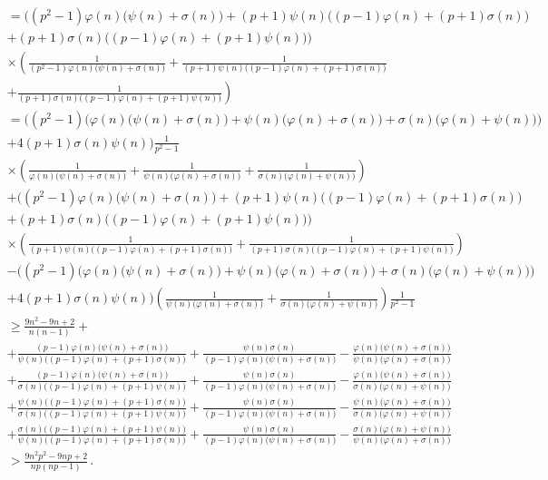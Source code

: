 \documentclass[12pt]{article}
\begin{document}
\begin{align*}
&=\Big((p^2-1)\varphi(n)\big(\psi(n)+\sigma(n)\big)+(p+1)\psi(n)\big((p-1)\varphi(n)+(p+1)\sigma(n)\big)\\
&+(p+1)\sigma(n)\big((p-1)\varphi(n)+(p+1)\psi(n)\big)\Big)\\
&\times\left(\frac{1}{(p^2-1)\varphi(n)\big(\psi(n)+\sigma(n)\big)}+\frac{1}{(p+1)\psi(n)\big((p-1)\varphi(n)+(p+1)\sigma(n)\big)}\right.\\
&\left.+\frac{1}{(p+1)\sigma(n)\big((p-1)\varphi(n)+(p+1)\psi(n)\big)}\right)\\
&=\bigg((p^2-1)\Big(\varphi(n)\big(\psi(n)+\sigma(n)\big)+\psi(n)\big(\varphi(n)+\sigma(n)\big)+\sigma(n)\big(\varphi(n)+\psi(n)\big)\Big)\\
&+4(p+1)\sigma(n)\psi(n)\bigg)\frac{1}{p^2-1}\\
&\times\left(\frac{1}{\varphi(n)\big(\psi(n)+\sigma(n)\big)}+\frac{1}{\psi(n)\big(\varphi(n)+\sigma(n)\big)}+\frac{1}{\sigma(n)\big(\varphi(n)+\psi(n)\big)}\right)\\
&+\Big((p^2-1)\varphi(n)\big(\psi(n)+\sigma(n)\big)+(p+1)\psi(n)\big((p-1)\varphi(n)+(p+1)\sigma(n)\big)\\
&+(p+1)\sigma(n)\big((p-1)\varphi(n)+(p+1)\psi(n)\big)\Big)\\
&\times\left(\frac{1}{(p+1)\psi(n)\big((p-1)\varphi(n)+(p+1)\sigma(n)\big)}+\frac{1}{(p+1)\sigma(n)\big((p-1)\varphi(n)+(p+1)\psi(n)\big)}\right)\\
&-\bigg((p^2-1)\Big(\varphi(n)\big(\psi(n)+\sigma(n)\big)+\psi(n)\big(\varphi(n)+\sigma(n)\big)+\sigma(n)\big(\varphi(n)+\psi(n)\big)\Big)\\
&+4(p+1)\sigma(n)\psi(n)\bigg)\left(\frac{1}{\psi(n)\big(\varphi(n)+\sigma(n)\big)}+\frac{1}{\sigma(n)\big(\varphi(n)+\psi(n)\big)}\right)\frac{1}{p^2-1}\\
&\geq\frac{9n^2-9n+2}{n(n-1)}+\\
&+\frac{(p-1)\varphi(n)\big(\psi(n)+\sigma(n)\big)}{\psi(n)\big((p-1)\varphi(n)+(p+1)\sigma(n)\big)}+\frac{\psi(n)\sigma(n)}{(p-1)\varphi(n)\big(\psi(n)+\sigma(n)\big)}
-\frac{\varphi(n)\big(\psi(n)+\sigma(n)\big)}{\psi(n)\big(\varphi(n)+\sigma(n)\big)}\nonumber\\
&+\frac{(p-1)\varphi(n)\big(\psi(n)+\sigma(n)\big)}{\sigma(n)\big((p-1)\varphi(n)+(p+1)\psi(n)\big)}+\frac{\psi(n)\sigma(n)}{(p-1)\varphi(n)\big(\psi(n)+\sigma(n)\big)}
-\frac{\varphi(n)\big(\psi(n)+\sigma(n)\big)}{\sigma(n)\big(\varphi(n)+\psi(n)\big)}\nonumber\\
&+\frac{\psi(n)\big((p-1)\varphi(n)+(p+1)\sigma(n)\big)}{\sigma(n)\big((p-1)\varphi(n)+(p+1)\psi(n)\big)}+\frac{\psi(n)\sigma(n)}{(p-1)\varphi(n)\big(\psi(n)+\sigma(n)\big)}
-\frac{\psi(n)\big(\varphi(n)+\sigma(n)\big)}{\sigma(n)\big(\varphi(n)+\psi(n)\big)}\nonumber\\
&+\frac{\sigma(n)\big((p-1)\varphi(n)+(p+1)\psi(n)\big)}{\psi(n)\big((p-1)\varphi(n)+(p+1)\sigma(n)\big)}+\frac{\psi(n)\sigma(n)}{(p-1)\varphi(n)\big(\psi(n)+\sigma(n)\big)}
-\frac{\sigma(n)\big(\varphi(n)+\psi(n)\big)}{\psi(n)\big(\varphi(n)+\sigma(n)\big)}\\
&>\frac{9n^2p^2-9np+2}{np(np-1)}\,.
\end{align*}
\end{document}
